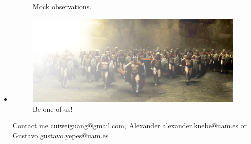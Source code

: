 \documentclass[aspectratio=43]{beamer}
\begin{document}
\begin{frame}
\begin{itemize}
{\begin{figure}
      \caption{Mock observations.}
    \end{figure}}
    \item<3|only@3>[]{
      \begin{figure}
        \includegraphics[width=\linewidth]{The300}
        \caption{Be one of us!}
      \end{figure}
      Contact me \alert{cuiweiguang@gmail.com}, Alexander \alert{alexander.knebe@uam.es} or Gustavo \alert{gustavo.yepes@uam.es}}
  \end{itemize}
\end{frame}
\end{document}

